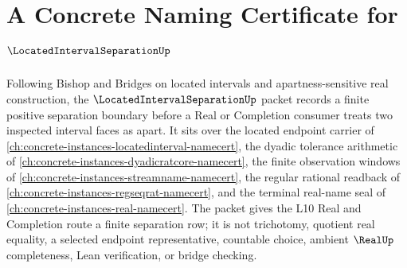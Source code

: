 \chapter{A Concrete Naming Certificate for $\LocatedIntervalSeparationUp$}
\label{ch:concrete-instances-located-interval-separation-namecert}

Following Bishop and Bridges on located intervals and apartness-sensitive real construction, the $\LocatedIntervalSeparationUp$ packet records a finite positive separation boundary before a Real or Completion consumer treats two inspected interval faces as apart. It sits over the located endpoint carrier of \autoref{ch:concrete-instances-locatedinterval-namecert}, the dyadic tolerance arithmetic of \autoref{ch:concrete-instances-dyadicratcore-namecert}, the finite observation windows of \autoref{ch:concrete-instances-streamname-namecert}, the regular rational readback of \autoref{ch:concrete-instances-regseqrat-namecert}, and the terminal real-name seal of \autoref{ch:concrete-instances-real-namecert}. The packet gives the L10 Real and Completion route a finite separation row; it is not trichotomy, quotient real equality, a selected endpoint representative, countable choice, ambient $\RealUp$ completeness, Lean verification, or bridge checking.


